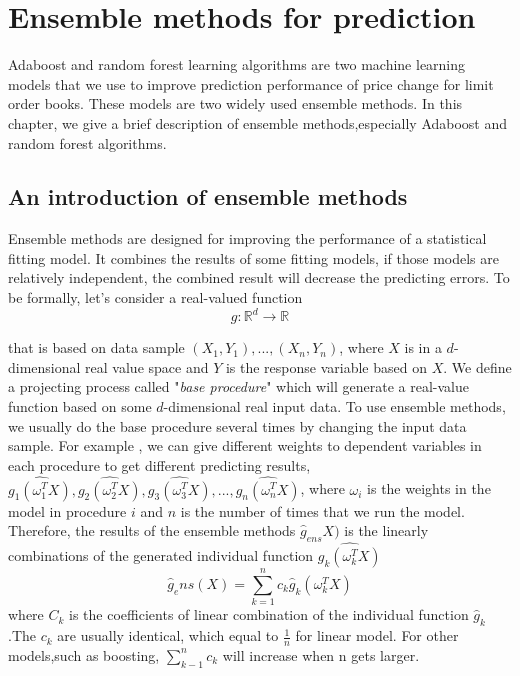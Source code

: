 \chapter{Ensemble methods for prediction}\label{ch:ensemble}
Adaboost and random forest learning algorithms are two machine learning models that we use to improve  prediction performance of price change for limit order books. These models are two widely used ensemble methods. In this chapter, we give a brief description of ensemble methods,especially Adaboost and random forest algorithms.

\section{An introduction of ensemble methods}
Ensemble methods are designed for improving the performance of a statistical fitting model. It combines the results of some fitting models, if those models are relatively independent, the combined result will decrease the predicting errors. 
To be formally,  let's consider a real-valued function 
\begin{equation}
	g:\mathbb{R}^d\rightarrow \mathbb{R}
\end{equation}

that is based on data sample $(X_1,Y_1),...,(X_n,Y_n)$, where $X$ is in a $d$-dimensional real value space and $Y$ is the response variable based on $X$. We define a projecting process called "\textit{base procedure}" which will generate a real-value function based on some $d$-dimensional real input data. To use ensemble methods, we usually do the base procedure several times by changing the input data sample. For example , we can give different weights to dependent variables in each procedure to get different predicting results,$\hat{g_1(\omega_1^T X)},\hat{g_2(\omega_2^T X)},\hat{g_3(\omega_3^T X)},...,\hat{g_n(\omega_n^T X)}$, where $\omega_i$ is the weights in the model in procedure $i$ and $n$ is the number of times that we run the model. Therefore, the results of the ensemble methods $\hat{g}_{ens}X)$ is the linearly combinations of the generated individual function $\hat{g_k(\omega_k^T X)}$
\begin{equation}
\hat{g}_ens(X)=\sum_{k=1}^{n}c_k\hat{g}_k(\omega_k^T X)
\end{equation}
where $C_k$ is the coefficients of linear combination of the individual function $\hat{g}_k$.The $c_k$ are usually identical, which equal to $\frac{1}{n}$ for linear model. For other models,such as boosting, $\sum_{k-1}^{n}c_k$ will increase when n gets larger.

